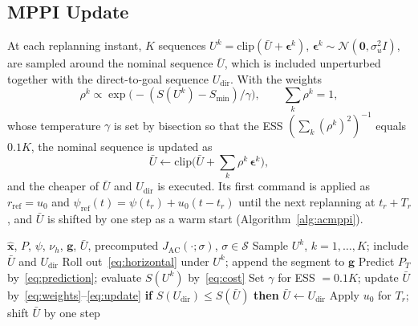 \documentclass[letterpaper, 10 pt, journal, twoside]{IEEEtran}
\newcommand{\bx}{\mathbf{x}}
\newcommand{\bg}{\mathbf{g}}
\newcommand{\JA}{J_{\mathrm{AC}}}
\begin{document}
\subsection{MPPI Update}
At each replanning instant, $K$ sequences $U^k = \mathrm{clip}(\bar{U} + \boldsymbol{\epsilon}^k)$, $\boldsymbol{\epsilon}^k \sim \mathcal{N}(\mathbf{0}, \sigma_u^2 I)$, are sampled around the nominal sequence $\bar{U}$, which is included unperturbed together with the direct-to-goal sequence $U_{\mathrm{dir}}$. With the weights
\begin{equation}
  \rho^k \propto \exp\!\big(-(S(U^k) - S_{\min})/\gamma\big), \qquad \textstyle\sum_k \rho^k = 1,
  \label{eq:weights}
\end{equation}
whose temperature $\gamma$ is set by bisection so that the ESS $(\sum_k (\rho^k)^2)^{-1}$ equals $0.1K$, the nominal sequence is updated as
\begin{equation}
  \bar{U} \leftarrow \mathrm{clip}\Big(\bar{U} + \textstyle\sum_{k}\rho^k\,\boldsymbol{\epsilon}^k\Big),
  \label{eq:update}
\end{equation}
and the cheaper of $\bar{U}$ and $U_{\mathrm{dir}}$ is executed. Its first command is applied as $r_{\mathrm{ref}} = u_0$ and $\psi_{\mathrm{ref}}(t) = \psi(t_r) + u_0(t - t_r)$ until the next replanning at $t_r + T_r$, and $\bar{U}$ is shifted by one step as a warm start (Algorithm~\ref{alg:acmppi}).

\begin{algorithm}[t]
\caption{AC-MPPI at a replanning instant}
\label{alg:acmppi}
\begin{algorithmic}[1]
\REQUIRE $\hat{\bx}$, $P$, $\psi$, $\nu_h$, $\bg$, $\bar{U}$, precomputed $\JA(\cdot;\sigma)$, $\sigma \in \mathcal{S}$
\STATE Sample $U^k$, $k = 1,\ldots,K$; include $\bar{U}$ and $U_{\mathrm{dir}}$
  \STATE Roll out~\eqref{eq:horizontal} under $U^k$; append the segment to $\bg$
  \STATE Predict $P_T$ by~\eqref{eq:prediction}; evaluate $S(U^k)$ by~\eqref{eq:cost}
\ENDFOR
\STATE Set $\gamma$ for ESS $= 0.1K$; update $\bar{U}$ by~\eqref{eq:weights}--\eqref{eq:update}
\STATE \textbf{if} $S(U_{\mathrm{dir}}) \le S(\bar{U})$ \textbf{then} $\bar{U} \leftarrow U_{\mathrm{dir}}$
\STATE Apply $u_0$ for $T_r$; shift $\bar{U}$ by one step
\end{algorithmic}
\end{algorithm}

\end{document}
